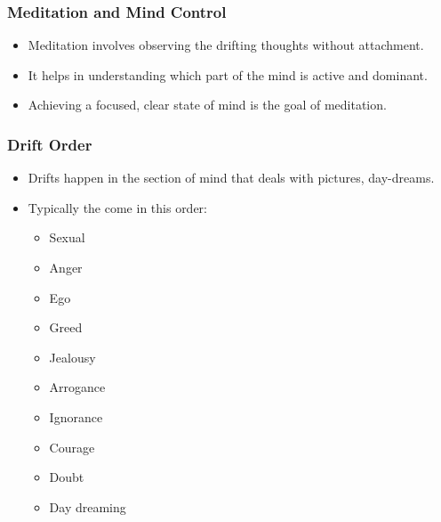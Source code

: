 \begin{frame}[fragile]\frametitle{Meditation and Mind Control}

\begin{itemize}
    \item Meditation involves observing the drifting thoughts without attachment.
    \item It helps in understanding which part of the mind is active and dominant.
    \item Achieving a focused, clear state of mind is the goal of meditation.
\end{itemize}

\end{frame}

\begin{frame}[fragile]
\frametitle{Drift Order}
\begin{itemize}
\item Drifts happen in the section of mind that deals with pictures, day-dreams.
\item Typically the come in this order:
\begin{itemize}
\item Sexual
\item Anger
\item Ego
\item Greed
\item Jealousy
\item Arrogance
\item Ignorance
\item Courage
\item Doubt
\item Day dreaming
\end{itemize}
\end{itemize}
\end{frame}


